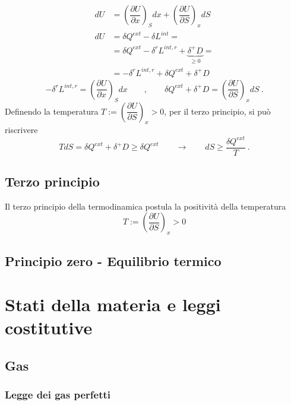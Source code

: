 \begin{equation}
\begin{aligned}
  d U & = \left(\dfrac{\partial U}{\partial x}\right)_S dx + \left(\dfrac{\partial U}{\partial S}\right)_x dS \\
  d U & = \delta Q^{ext} - \delta L^{int} = \\
      & = \delta Q^{ext} - \delta^r L^{int,r} + \underbrace{\delta^+ D}_{\ge 0} = \\
      & = -\delta^r L^{int,r} + \delta Q^{ext} + \delta^+ D 
\end{aligned}
\end{equation}
\begin{equation}
  - \delta^r L^{int,r} =  \left(\dfrac{\partial U}{\partial x}\right)_S dx
\qquad , \qquad
  \delta Q^{ext} + \delta^+ D = \left(\dfrac{\partial U}{\partial S}\right)_x dS \ .
\end{equation}
Definendo la temperatura $T := \left(\dfrac{\partial U}{\partial S}\right)_x > 0$, per il terzo principio, si può riscrivere 
\begin{equation}
  T dS = \delta Q^{ext} + \delta^+ D \ge \delta Q^{ext} \qquad \rightarrow \qquad dS \ge \dfrac{\delta Q^{ext}}{T} \ .
\end{equation}

\section{Terzo principio}
Il terzo principio della termodinamica postula la positività della temperatura
\begin{equation}
  T := \left(\dfrac{\partial U}{\partial S}\right)_x > 0
\end{equation}

\section{Principio zero - Equilibrio termico}

\chapter{Stati della materia e leggi costitutive}
\section{Gas}
\subsection{Legge dei gas perfetti}
